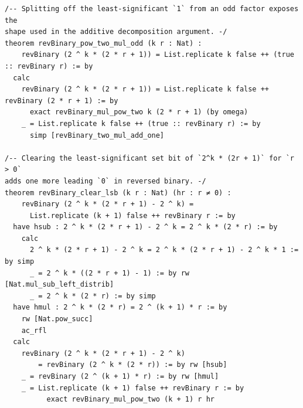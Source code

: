 \documentclass[11pt]{article}
\theoremstyle{definition}
\theoremstyle{remark}
\begin{document}
\begin{lstlisting}
/-- Splitting off the least-significant `1` from an odd factor exposes the
shape used in the additive decomposition argument. -/
theorem revBinary_pow_two_mul_odd (k r : Nat) :
    revBinary (2 ^ k * (2 * r + 1)) = List.replicate k false ++ (true :: revBinary r) := by
  calc
    revBinary (2 ^ k * (2 * r + 1)) = List.replicate k false ++ revBinary (2 * r + 1) := by
      exact revBinary_mul_pow_two k (2 * r + 1) (by omega)
    _ = List.replicate k false ++ (true :: revBinary r) := by
      simp [revBinary_two_mul_add_one]

/-- Clearing the least-significant set bit of `2^k * (2r + 1)` for `r > 0`
adds one more leading `0` in reversed binary. -/
theorem revBinary_clear_lsb (k r : Nat) (hr : r ≠ 0) :
    revBinary (2 ^ k * (2 * r + 1) - 2 ^ k) =
      List.replicate (k + 1) false ++ revBinary r := by
  have hsub : 2 ^ k * (2 * r + 1) - 2 ^ k = 2 ^ k * (2 * r) := by
    calc
      2 ^ k * (2 * r + 1) - 2 ^ k = 2 ^ k * (2 * r + 1) - 2 ^ k * 1 := by simp
      _ = 2 ^ k * ((2 * r + 1) - 1) := by rw [Nat.mul_sub_left_distrib]
      _ = 2 ^ k * (2 * r) := by simp
  have hmul : 2 ^ k * (2 * r) = 2 ^ (k + 1) * r := by
    rw [Nat.pow_succ]
    ac_rfl
  calc
    revBinary (2 ^ k * (2 * r + 1) - 2 ^ k)
        = revBinary (2 ^ k * (2 * r)) := by rw [hsub]
    _ = revBinary (2 ^ (k + 1) * r) := by rw [hmul]
    _ = List.replicate (k + 1) false ++ revBinary r := by
          exact revBinary_mul_pow_two (k + 1) r hr


\end{lstlisting}
\end{document}
